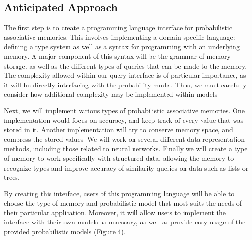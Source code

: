 \documentclass{sig-alternate}
\begin{document}
\subsection{Anticipated Approach}
\label{subsec:approach}

The first step is to create a programming language interface for probabilistic
associative memories. This involves implementing a domain specific language: 
defining a type system as well as a syntax for programming with an underlying memory.
A major component of this syntax will be the grammar of memory storage, 
as well as the different types of queries that can be made to the memory. The complexity allowed
within our query interface is of particular importance, as it will be directly
interfacing with the probability model. Thus, we must carefully consider 
how additional complexity may be implemented within models. 

Next, we will implement various types of probabilistic associative memories.
One implementation would focus on accuracy, and keep track of every value that
was stored in it. Another implementation will try to conserve memory space,
and compress the stored values. We will work on several different data representation methods,
including those related to neural networks. Finally we will create
a type of memory to work specifically with structured data, allowing the memory
to recognize types and improve accuracy of similarity queries on data such as lists or trees.

By creating this interface, users of this programming language will be able to
choose the type of memory and probabilistic model that most suits the needs of their particular
application. Moreover, it will allow users to implement the interface with their own models as necessary, 
as well as provide easy usage of the provided probabilistic models (Figure 4).
\end{document}
